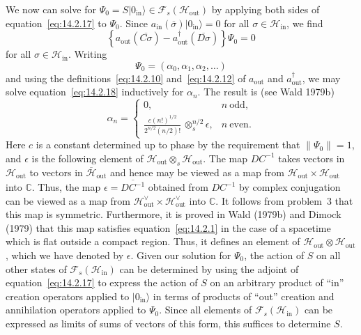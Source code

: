 We now can solve for
\(\Psi_0=S\lvert0_{\mathrm{in}}\rangle\in
\mathcal F_s(\mathcal H_{\mathrm{out}})\) by applying both sides of
equation~\eqref{eq:14.2.17} to \(\Psi_0\). Since
\(a_{\mathrm{in}}(\overline\sigma)\lvert0_{\mathrm{in}}\rangle=0\) for all
\(\sigma\in\mathcal H_{\mathrm{in}}\), we find
\begin{equation}
  \left\{a_{\mathrm{out}}(\overline{C\sigma})
  -a_{\mathrm{out}}^\dagger(\overline{D\sigma})\right\}\Psi_0=0
  \tag{14.2.18}\label{eq:14.2.18}
\end{equation}
for all \(\sigma\in\mathcal H_{\mathrm{in}}\). Writing
\begin{equation}
  \Psi_0=(\alpha_0,\alpha_1,\alpha_2,\ldots)
  \tag{14.2.19}\label{eq:14.2.19}
\end{equation}
and using the definitions~\eqref{eq:14.2.10} and~\eqref{eq:14.2.12} of
\(a_{\mathrm{out}}\) and \(a_{\mathrm{out}}^\dagger\), we may solve
equation~\eqref{eq:14.2.18} inductively for \(\alpha_n\). The result is (see Wald
1979b)
\begin{equation}
  \alpha_n=
  \begin{cases}
    0, & n\ \text{odd},\\[3pt]
    \displaystyle
    \frac{c(n!)^{1/2}}{2^{n/2}(n/2)!}\,
    \otimes_s^{n/2}\epsilon, & n\ \text{even}.
  \end{cases}
  \tag{14.2.20}\label{eq:14.2.20}
\end{equation}
Here \(c\) is a constant determined up to phase by the requirement that
\(\lVert\Psi_0\rVert=1\), and \(\epsilon\) is the following element of
\(\mathcal H_{\mathrm{out}}\otimes_s\mathcal H_{\mathrm{out}}\). The map
\(DC^{-1}\) takes vectors in \(\mathcal H_{\mathrm{out}}\) to vectors in
\(\overline{\mathcal H}_{\mathrm{out}}\) and hence may be viewed as a map from
\(\mathcal H_{\mathrm{out}}\times\mathcal H_{\mathrm{out}}\) into \(\mathbb C\).
Thus, the map \(\epsilon=\overline{DC^{-1}}\) obtained from \(DC^{-1}\) by complex
conjugation can be viewed as a map from
\(\mathcal H_{\mathrm{out}}^\vee\times\mathcal H_{\mathrm{out}}^\vee\) into
\(\mathbb C\). It follows from problem~3 that this map is symmetric. Furthermore,
it is proved in Wald (1979b) and Dimock (1979) that this map satisfies
equation~\eqref{eq:14.2.1} in the case of a spacetime which is flat outside a compact
region. Thus, it defines an element of
\(\mathcal H_{\mathrm{out}}\otimes\mathcal H_{\mathrm{out}}\), which we have
denoted by \(\epsilon\). Given our solution for \(\Psi_0\), the action of \(S\) on
all other states of \(\mathcal F_s(\mathcal H_{\mathrm{in}})\) can be determined by
using the adjoint of equation~\eqref{eq:14.2.17} to express the action of \(S\) on an
arbitrary product of ``in'' creation operators applied to
\(\lvert0_{\mathrm{in}}\rangle\) in terms of products of ``out'' creation and
annihilation operators applied to \(\Psi_0\). Since all elements of
\(\mathcal F_s(\mathcal H_{\mathrm{in}})\) can be expressed as limits of sums of
vectors of this form, this suffices to determine \(S\).

